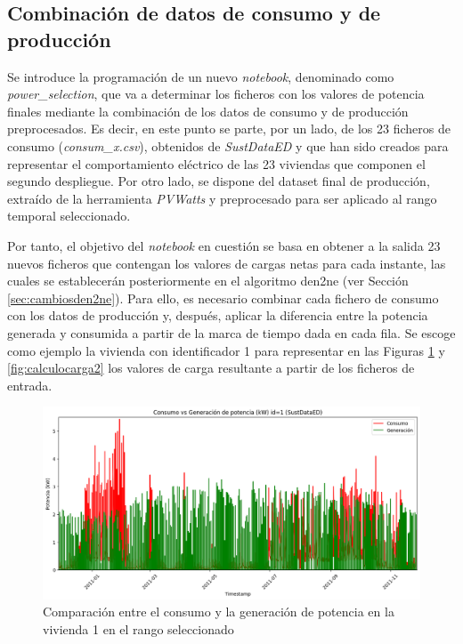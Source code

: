 \subsection{Combinación de datos de consumo y de producción}
\label{sec:combinacion}

Se introduce la programación de un nuevo \textit{notebook}, denominado como \textit{power\_selection}, que va a determinar los ficheros con los valores de potencia finales mediante la combinación de los datos de consumo y de producción preprocesados. Es decir, en este punto se parte, por un lado, de los 23 ficheros de consumo (\textit{consum\_x.csv}), obtenidos de \textit{SustDataED} y que han sido creados para representar el comportamiento eléctrico de las 23 viviendas que componen el segundo despliegue. Por otro lado, se dispone del dataset final de producción, extraído de la herramienta \textit{PVWatts} y preprocesado para ser aplicado al rango temporal seleccionado. 

\vspace{3mm}

Por tanto, el objetivo del \textit{notebook} en cuestión se basa en obtener a la salida 23 nuevos ficheros que contengan los valores de cargas netas para cada instante, las cuales se establecerán posteriormente en el algoritmo \gls{den2ne} (ver Sección \ref{sec:cambiosden2ne}). Para ello, es necesario combinar cada fichero de consumo con los datos de producción y, después, aplicar la diferencia entre la potencia generada y consumida a partir de la marca de tiempo dada en cada fila. Se escoge como ejemplo la vivienda con identificador 1 para representar en las Figuras \ref{fig:calculocarga} y \ref{fig:calculocarga2} los valores de carga resultante a partir de los ficheros de entrada.

\vspace{3mm}

\begin{figure}[H]
  \centering
  \includegraphics[width=1\textwidth]{img/diseno/calculocarga.png}
  \caption{Comparación entre el consumo y la generación de potencia en la vivienda 1 en el rango seleccionado}
  \label{fig:calculocarga}
\end{figure}


